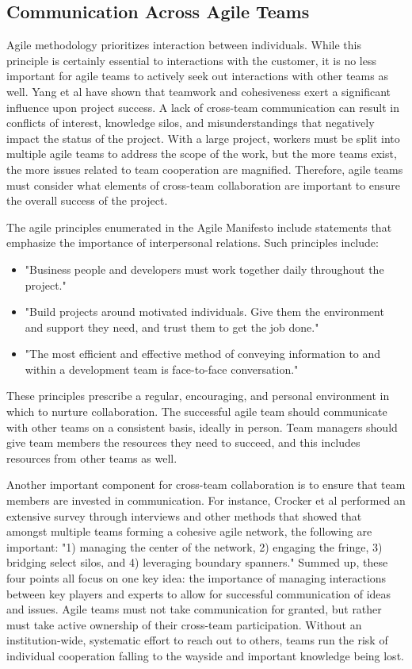 \subsection{Communication Across Agile Teams}

Agile methodology prioritizes interaction between individuals.
While this principle is certainly essential to interactions with the customer, it is no less important for agile teams to actively seek out interactions with other teams as well.
Yang et al\cite{YANG} have shown that teamwork and cohesiveness exert a significant influence upon project success.
A lack of cross-team communication can result in conflicts of interest, knowledge silos, and misunderstandings that negatively impact the status of the project.
With a large project, workers must be split into multiple agile teams to address the scope of the work, but the more teams exist, the more issues related to team cooperation are magnified.
Therefore, agile teams must consider what elements of cross-team collaboration are important to ensure the overall success of the project.

The agile principles enumerated in the Agile Manifesto include statements that emphasize the importance of interpersonal relations. Such principles include:
\begin{itemize}
\item "Business people and developers must work together daily throughout the project."
\item "Build projects around motivated individuals. Give them the environment and support they need, and trust them to get the job done."
\item "The most efficient and effective method of conveying information to and within a development team is face-to-face conversation." \cite{AgileMani}
\end{itemize}

These principles prescribe a regular, encouraging, and personal environment in which to nurture collaboration.
The successful agile team should communicate with other teams on a consistent basis, ideally in person.
Team managers should give team members the resources they need to succeed, and this includes resources from other teams as well.

Another important component for cross-team collaboration is to ensure that team members are invested in communication.
For instance, Crocker et al\cite{HBR} performed an extensive survey through interviews and other methods that showed that amongst multiple teams forming a cohesive agile network, the following are important: "1) managing the center of the network, 2) engaging the fringe, 3) bridging select silos, and 4) leveraging boundary spanners."
Summed up, these four points all focus on one key idea: the importance of managing interactions between key players and experts to allow for successful communication of ideas and issues.
Agile teams must not take communication for granted, but rather must take active ownership of their cross-team participation.
Without an institution-wide, systematic effort to reach out to others, teams run the risk of individual cooperation falling to the wayside and important knowledge being lost.

